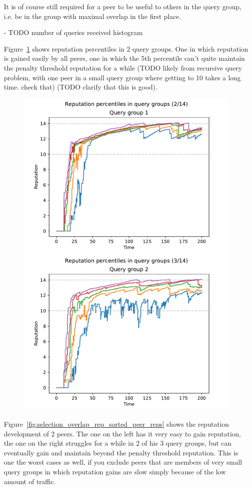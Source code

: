 It is of course still required for a peer to be useful to others in the query
group, i.e. be in the group with maximal overlap in the first place.

- TODO number of queries received histogram

Figure~\ref{fig:selection_overlap_rep_sorted_rep_percs} shows reputation
percentiles in 2 query groups. One in which reputation is gained easily by all
peers, one in which the 5th percentile can't quite maintain the penalty
threshold reputation for a while (TODO likely from recursive query problem, with
one peer in a small query group where getting to 10 takes a long time.  check
that) (TODO clarify that this is good).

\begin{figure}[t]
\centering
\includegraphics[width=0.5\columnwidth]{figures/selection_overlap_rep_sorted_rep_percs_2_of_14}%
\includegraphics[width=0.5\columnwidth]{figures/selection_overlap_rep_sorted_rep_percs_3_of_14}
\label{fig:selection_overlap_rep_sorted_rep_percs}
\end{figure}

Figure~\ref{fig:selection_overlap_rep_sorted_peer_reps} shows the reputation
development of 2 peers. The one on the left has it very easy to gain reputation,
the one on the right struggles for a while in 2 of his 3 query groups, but can
eventually gain and maintain beyond the penalty threshold reputation. This is
one the worst cases as well, if you exclude peers that are members of very small
query groups in which reputation gains are slow simply because of the low amount
of traffic.


